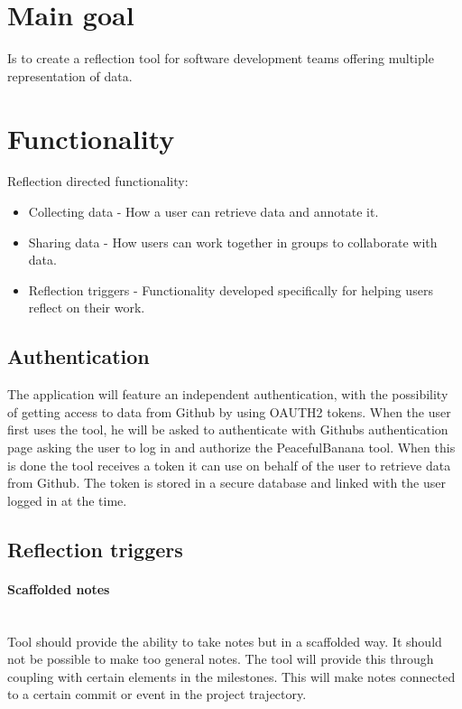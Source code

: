 \section{Main goal}
Is to create a reflection tool for software development teams offering multiple representation of data. %

\section{Functionality}

Reflection directed functionality:
\begin{itemize}
\item Collecting data - How a user can retrieve data and annotate it. 
\item Sharing data - How users can work together in groups to collaborate with data. 
\item Reflection triggers - Functionality developed specifically for helping users reflect on their work.
\end{itemize}

\subsection{Authentication}
The application will feature an independent authentication, with the possibility of getting access to data from Github by using OAUTH2 tokens. When the user first uses the tool, he will be asked to authenticate with Githubs authentication page asking the user to log in and authorize the PeacefulBanana tool. When this is done the tool receives a token it can use on behalf of the user to retrieve data from Github. The token is stored in a secure database and linked with the user logged in at the time. 

\subsection{Reflection triggers}
\paragraph{Scaffolded notes}\mbox{}\\
Tool should provide the ability to take notes but in a scaffolded way. It should not be possible to make too general notes. The tool will provide this through coupling with certain elements in the milestones. This will make notes connected to a certain commit or event in the project trajectory. 

